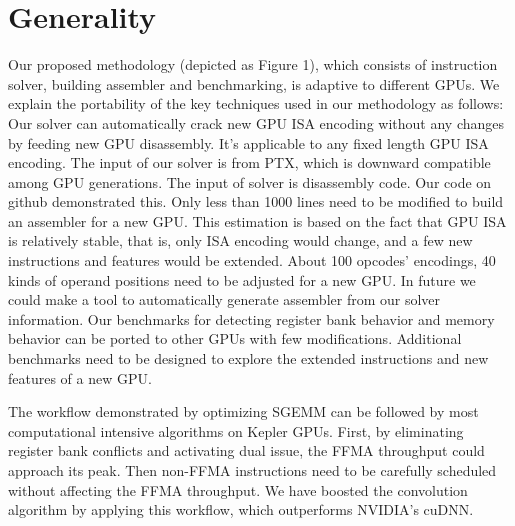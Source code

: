 \section{Generality}
\label{sec:generality}
Our proposed methodology (depicted as Figure 1), which consists of instruction solver, building assembler and 
benchmarking, is adaptive to different GPUs. We explain the portability of the key techniques used in our methodology 
as follows:
Our solver can automatically crack new GPU ISA encoding without any changes by feeding new GPU disassembly. It's 
applicable to any fixed length GPU ISA encoding. The input of our solver is from PTX, which is downward compatible 
among GPU generations. The input of solver is disassembly code. Our code on github demonstrated this.
Only less than 1000 lines need to be modified to build an assembler for a new GPU. This estimation is based on the fact 
that GPU ISA is relatively stable, that is, only ISA encoding would change, and a few new instructions and features 
would be extended. About 100 opcodes' encodings, 40 kinds of operand positions need to be adjusted for a new GPU. In 
future we could make a tool to automatically generate  assembler from our solver information.
Our benchmarks for detecting register bank behavior and memory behavior can be ported to other GPUs with few 
modifications. Additional benchmarks need to be designed to explore the extended instructions and new features of a new 
GPU.

The workflow demonstrated by optimizing SGEMM can be followed by most computational intensive algorithms on Kepler 
GPUs. First, by eliminating register bank conflicts and activating dual issue, the FFMA throughput could approach its 
peak. Then non-FFMA instructions need to be carefully scheduled without affecting the FFMA throughput. We have boosted 
the convolution algorithm by applying this workflow, which outperforms NVIDIA's cuDNN.
